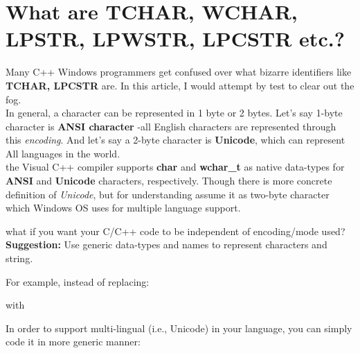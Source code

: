 	\section{What are TCHAR, WCHAR, LPSTR, LPWSTR, LPCSTR etc.?}
	Many C++ Windows programmers get confused over what bizarre identifiers like \textbf{TCHAR, LPCSTR} are. In this article, I would attempt by test to clear out the fog.\\
	
	In general, a character can be represented in 1 byte or 2 bytes. Let's say 1-byte character is \textbf{ANSI character} -all English characters are represented through this \textit{encoding}. And let's say a 2-byte character is \textbf{Unicode}, which can represent All languages in the world.\\
	
	the Visual C++ compiler supports \textbf{char} and \textbf{wchar\_t} as native data-types for \textbf{ANSI} and \textbf{Unicode} characters, respectively. Though there is more concrete definition of \textit{Unicode}, but for understanding assume it as two-byte character which Windows OS uses for multiple language support.\\
	
	
	what if you want your C/C++ code to be independent of encoding/mode used?\\
	
	\textbf{Suggestion:} Use generic data-types and names to represent characters and string.
	
	For example, instead of replacing:
	
	
	with
	
	
	
	In order to support multi-lingual (i.e., Unicode) in your language, you can simply code it in more generic manner:
	
